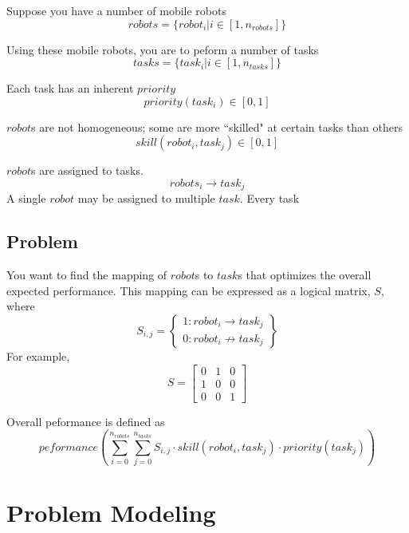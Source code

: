 \documentclass[a4paper]{article}
\begin{document}
Suppose you have a number of mobile robots
$$\mathit{robots} = \{ \mathit{robot}_i | i \in [1, n_\mathit{robots}] \}$$

Using these mobile robots, you are to peform a number of tasks
$$\mathit{tasks} = \{ \mathit{task}_i | i \in [1, n_\mathit{tasks}] \}$$

Each task has an inherent $\mathit{priority}$
$$\mathit{priority}(\mathit{task}_i) \in [0 ,1]$$

$\mathit{robot}$s are not homogeneous; some are more ``skilled" at certain tasks than others
$$\mathit{skill}(\mathit{robot}_i, \mathit{task}_j) \in [0 ,1]$$

$\mathit{robot}$s are assigned to tasks.
$$\mathit{robots}_i \rightarrow \mathit{task}_j$$
A single $\mathit{robot}$ may be assigned to multiple $\mathit{task}$. Every task

\subsection{Problem}

You want to find the mapping of $\mathit{robot}$s to $\mathit{task}$s that optimizes the overall expected performance. This mapping can be expressed as a logical matrix, $S$, where
$$S_{i,j} = \left\{
  \begin{array}{lr}
     1 : \mathit{robot}_i \rightarrow \mathit{task}_j \\
     0 : \mathit{robot}_i \not \rightarrow \mathit{task}_j
  \end{array}
\right\}$$
For example,
$$S = \begin{bmatrix}
  0 & 1 & 0 \\
  1 & 0 & 0 \\
  0 & 0 & 1
\end{bmatrix}$$

Overall peformance is defined as
$$
  \mathit{peformance}\left(
    \sum_{i=0}^{n_\mathit{robots}}
    \sum_{j=0}^{n_\mathit{tasks}}
    S_{i,j} \cdot
    \mathit{skill}(\mathit{robot}_i, \mathit{task}_j) \cdot
    \mathit{priority}(\mathit{task}_j)
  \right)
$$

\section{Problem Modeling}

\end{document}
